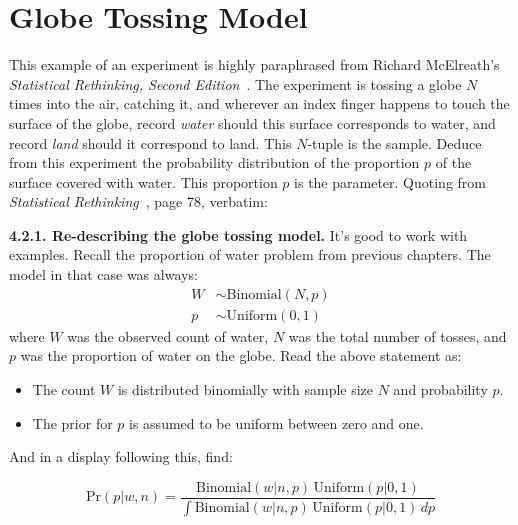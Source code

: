 \documentclass[
twoside=true,
paper=letter,
fontsize=11pt,
pagesize=auto,
leqno,
openany,
headsepline,
overfullrule,
]{scrbook}
\theoremstyle{plain}
\theoremstyle{plain}
\theoremstyle{definition}
\theoremstyle{bfnoteitalic}
\theoremstyle{bfnoteroman}
\begin{document}
\section{Globe Tossing Model}\label{globe_tossing}
This example of an experiment is highly paraphrased from Richard McElreath's  \textsl{Statistical Rethinking, Second Edition}~\cite{sr_mcelreath_2020}.
The experiment is tossing a globe $N$ times into the air, catching it, and wherever an index finger happens to touch the surface of the globe, record  \textit{water} should this surface corresponds to water, and record \textit{land} should it correspond to land. This $N$-tuple is the sample. Deduce from this experiment the probability distribution of the proportion $p$ of the surface covered with water. This proportion $p$ is the parameter.
Quoting from \textsl{Statistical Rethinking}~\cite{sr_mcelreath_2020}, page 78, verbatim:
\begin{quoting}\small
\textbf{4.2.1. Re-describing the globe tossing model.} It’s good to work with examples. Recall the
proportion of water problem from previous chapters. The model in that case was always:
\begin{align*}
W & \sim \text{Binomial}(N, p) \\
p & \sim \text{Uniform}(0, 1)
\end{align*}
where $W$ was the observed count of water, $N$ was the total number of tosses, and $p$ was the
proportion of water on the globe. Read the above statement as:
\begin{itemize}
\item[]The count $W$ is distributed binomially with sample size $N$ and probability $p$.
\item[]The prior for $p$ is assumed to be uniform between zero and one.
\end{itemize}
\end{quoting}
And in a display following this, find:
\begin{quoting}\small
\[
\text{Pr}(p\vert w,n)
=
\frac{\text{Binomial}(w\vert n,p)\,\text{Uniform}(p\vert 0,1)}
{\int \text{Binomial}(w\vert n,p)\,\text{Uniform}(p\vert 0,1)\, dp}
\]
\end{quoting}
\end{document}

